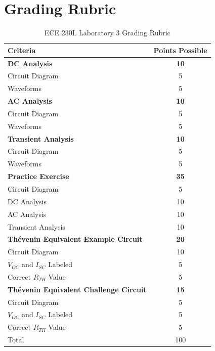 \documentclass[12pt]{../manual}
\begin{document}
\section*{Grading Rubric}
\vfill %
\begin{table}[ht!]
\caption{ECE 230L Laboratory 3 Grading Rubric}
\centering
\begin{tabular}{l|c} \hline
Criteria & Points Possible \\ \hline \hline
\textbf{DC Analysis}			& \textbf{10} \\
Circuit Diagram 				& 5 \\
Waveforms 						& 5 \\ \hline
\textbf{AC Analysis}			& \textbf{10} \\
Circuit Diagram 				& 5 \\
Waveforms 						& 5 \\ \hline
\textbf{Transient Analysis}		& \textbf{10} \\
Circuit Diagram 				& 5 \\ 
Waveforms 						& 5 \\ \hline
\textbf{Practice Exercise}		& \textbf{35} \\
Circuit Diagram 				& 5 \\
DC Analysis						& 10 \\
AC Analysis						& 10 \\
Transient Analysis				& 10 \\ \hline
\textbf{Th\'evenin Equivalent Example Circuit} & \textbf{20} \\
Circuit Diagram					& 10 \\
$V_{OC}$ and $I_{SC}$ Labeled	& 5 \\
Correct $R_{TH}$ Value			& 5 \\ \hline
\textbf{Th\'evenin Equivalent Challenge Circuit} & \textbf{15} \\
Circuit Diagram					& 5 \\
$V_{OC}$ and $I_{SC}$ Labeled	& 5 \\
Correct $R_{TH}$ Value			& 5 \\ \hline \hline
Total							& 100 \\ \hline
\end{tabular}
\end{table}
\vfill %
\end{document}

